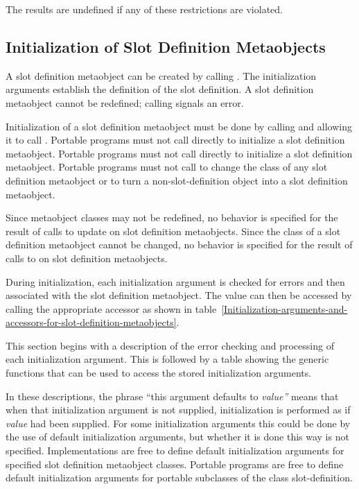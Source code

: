 The results are undefined if any of these restrictions are violated.

\subsection{Initialization of Slot Definition Metaobjects}
\label{INITIALIZATION-OF-SLOT-DEFINITION-METAOBJECTS}

A slot definition metaobject can be created by calling . The
initialization arguments establish the definition of the slot definition. A slot
definition metaobject cannot be redefined; calling 
signals an error.

Initialization of a slot definition metaobject must be done by calling
 and allowing it to call . Portable
programs must not call  directly to initialize a slot
definition metaobject. Portable programs must not call 
directly to initialize a slot definition metaobject. Portable programs must not
call  to change the class of any slot definition metaobject or
to turn a non-slot-definition object into a slot definition metaobject.

Since metaobject classes may not be redefined, no behavior is specified for the
result of calls to update on slot definition
metaobjects. Since the class of a slot definition metaobject cannot be changed,
no behavior is specified for the result of calls to
 on slot definition metaobjects.

During initialization, each initialization argument is checked for errors and
then associated with the slot definition metaobject. The value can then be
accessed by calling the appropriate accessor as shown in
table~\ref{Initialization-arguments-and-accessors-for-slot-definition-metaobjects}.

This section begins with a description of the error checking and processing of
each initialization argument. This is followed by a table showing the generic
functions that can be used to access the stored initialization arguments.

In these descriptions, the phrase ``this argument defaults to \emph{value''}
means that when that initialization argument is not supplied, initialization is
performed as if \emph{value} had been supplied. For some initialization
arguments this could be done by the use of default initialization arguments, but
whether it is done this way is not specified. Implementations are free to define
default initialization arguments for specified slot definition metaobject
classes. Portable programs are free to define default initialization arguments
for portable subclasses of the class slot-definition.

